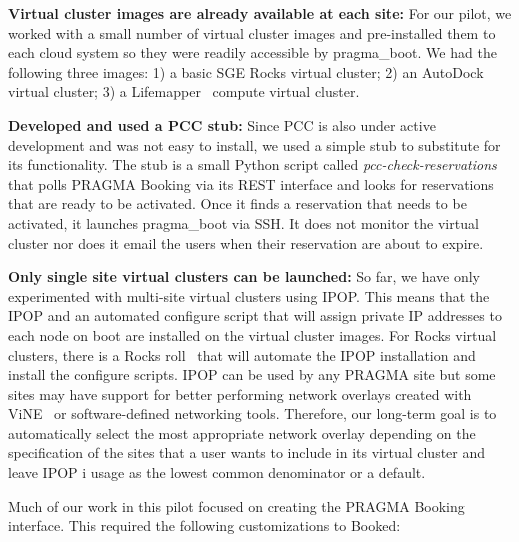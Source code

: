 \documentclass{acm_proc_article-sp}
\begin{document}
\textbf{Virtual cluster images are already available at each site:}  For our pilot, we worked with a small number of virtual cluster images and pre-installed them to each cloud system so they were readily accessible by pragma\_boot.  We had the following three images: 1) a basic SGE Rocks virtual cluster; 2) an AutoDock virtual cluster;  3) a Lifemapper~\cite{lifemapper} compute virtual cluster.   

\textbf{Developed and used a PCC stub:}  Since PCC is also under active development and was not easy to install, we used a simple stub to substitute for its functionality.  The stub is a small Python script called \textit{pcc-check-reservations} that polls PRAGMA Booking via its REST interface and looks for reservations that are ready to be activated.  Once it finds a reservation that needs to be activated, it launches pragma\_boot via SSH.  It does not  monitor the virtual cluster nor does it email the users when their reservation are about to expire.  

\textbf{Only single site virtual clusters can be launched:}  So far, we have only experimented with multi-site virtual clusters using IPOP.  This means that the IPOP  and an automated configure script that will assign private IP addresses to each node on boot are installed on the virtual cluster images.  For Rocks virtual clusters, there is a Rocks roll~\cite{ipoproll} that will automate the IPOP installation and install the configure scripts.  IPOP can be used by any PRAGMA site but some sites may have support for better performing network overlays created with ViNE~\cite{vine} or software-defined networking tools.  Therefore, our long-term goal is to automatically select the most appropriate network overlay depending on the  specification of the sites that a user wants to include in its virtual cluster and leave IPOP i usage as the lowest common denominator or a default.

Much of our work in this pilot focused on creating the PRAGMA Booking interface.  This required the following customizations to Booked:
\end{document}
